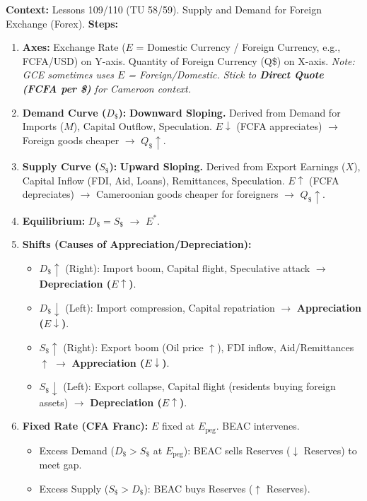 \documentclass[11pt]{article}
\begin{document}
\begin{methode}
\textbf{Context:} Lessons 109/110 (TU 58/59). Supply and Demand for Foreign Exchange (Forex).
\textbf{Steps:}
\begin{enumerate}
    \item \textbf{Axes:} Exchange Rate ($E$ = Domestic Currency / Foreign Currency, e.g., FCFA/USD) on Y-axis. Quantity of Foreign Currency (Q\$) on X-axis. \textit{Note: GCE sometimes uses $E$ = Foreign/Domestic. Stick to \textbf{Direct Quote (FCFA per \$)} for Cameroon context.}
    \item \textbf{Demand Curve ($D_\$$):} \textbf{Downward Sloping.} Derived from Demand for Imports ($M$), Capital Outflow, Speculation. $E \downarrow$ (FCFA appreciates) $\rightarrow$ Foreign goods cheaper $\rightarrow$ $Q_\$ \uparrow$.
    \item \textbf{Supply Curve ($S_\$$):} \textbf{Upward Sloping.} Derived from Export Earnings ($X$), Capital Inflow (FDI, Aid, Loans), Remittances, Speculation. $E \uparrow$ (FCFA depreciates) $\rightarrow$ Cameroonian goods cheaper for foreigners $\rightarrow$ $Q_\$ \uparrow$.
    \item \textbf{Equilibrium:} $D_\$ = S_\$$ $\rightarrow$ $E^*$.
    \item \textbf{Shifts (Causes of Appreciation/Depreciation):}
        \begin{itemize}
            \item $D_\$ \uparrow$ (Right): Import boom, Capital flight, Speculative attack $\rightarrow$ \textbf{Depreciation ($E \uparrow$)}.
            \item $D_\$ \downarrow$ (Left): Import compression, Capital repatriation $\rightarrow$ \textbf{Appreciation ($E \downarrow$)}.
            \item $S_\$ \uparrow$ (Right): Export boom (Oil price $\uparrow$), FDI inflow, Aid/Remittances $\uparrow$ $\rightarrow$ \textbf{Appreciation ($E \downarrow$)}.
            \item $S_\$ \downarrow$ (Left): Export collapse, Capital flight (residents buying foreign assets) $\rightarrow$ \textbf{Depreciation ($E \uparrow$)}.
        \end{itemize}
    \item \textbf{Fixed Rate (CFA Franc):} $E$ fixed at $E_{\text{peg}}$. BEAC intervenes.
        \begin{itemize}
            \item Excess Demand ($D_\$ > S_\$$ at $E_{\text{peg}}$): BEAC sells Reserves ($\downarrow$ Reserves) to meet gap.
            \item Excess Supply ($S_\$ > D_\$$): BEAC buys Reserves ($\uparrow$ Reserves).
        \end{itemize}
\end{enumerate}
\end{methode}
\end{document}
